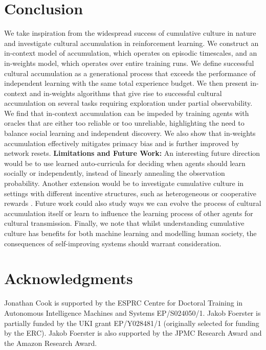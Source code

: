 \documentclass{article}
\begin{document}
\section{Conclusion}
We take inspiration from the widespread success of cumulative culture in nature and investigate cultural accumulation in reinforcement learning. We construct an in-context model of accumulation, which operates on episodic timescales, and an in-weights model, which operates over entire training runs. We define successful cultural accumulation as a generational process that exceeds the performance of independent learning with the same total experience budget. We then present in-context and in-weights algorithms that give rise to successful cultural accumulation on several tasks requiring exploration under partial observability. We find that in-context accumulation can be impeded by training agents with oracles that are either too reliable or too unreliable, highlighting the need to balance social learning and independent discovery. We also show that in-weights accumulation effectively mitigates primacy bias and is further improved by network resets.
\textbf{Limitations and Future Work:} An interesting future direction would be to use learned auto-curricula \citep{dennis2020emergent, jiang2021replay} for deciding when agents should learn socially or independently, instead of linearly annealing the observation probability. Another extension would be to investigate cumulative culture in settings with different incentive structures, such as heterogeneous or cooperative rewards \citep{rutherford2023jaxmarl}. Future work could also study ways we can evolve the process of cultural accumulation itself \citep{lu2023arbitrary} or learn to influence the learning process of other agents \citep{lu2022model, lu2023adversarial} for cultural transmission. Finally, we note that whilst understanding cumulative culture has benefits for both machine learning and modelling human society, the consequences of self-improving systems should warrant consideration.
\section*{Acknowledgments}
Jonathan Cook is supported by the ESPRC Centre for Doctoral Training in Autonomous Intelligence Machines and Systems EP/S024050/1. Jakob Foerster is partially funded by the UKI grant EP/Y028481/1 (originally selected for funding by the ERC). Jakob Foerster is also supported by the JPMC Research Award and the Amazon Research Award.


\newpage
\appendix
\end{document}
